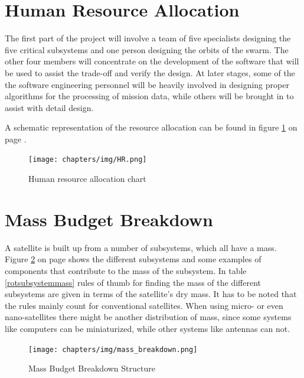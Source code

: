 \section{Human Resource Allocation}
\label{DDHR}
The first part of the project will involve a team of five specialists designing the five critical subsystems and one person designing the orbits of the swarm. The other four members will concentrate on the development of the software that will be used to assist the trade-off and verify the design. At later stages, some of the the software engineering personnel will be heavily involved in designing proper algorithms for the processing of mission data, while others will be brought in to assist with detail design. 

A schematic representation of the resource allocation can be found in figure \ref{fig:blBBHR} on page \pageref{fig:blBBHR}.

\begin{figure}[ht!]
\begin{center}
\texttt{[image: chapters/img/HR.png]}
\label{fig:blBBHR}
\caption{Human resource allocation chart}
\end{center}
\end{figure}


\section{Mass Budget Breakdown}
\label{sect_mass_budget}
A satellite is built up from a number of subsystems, which all have a mass. Figure \ref{massbreakdown} on page \pageref{massbreakdown} shows the different subsystems and some examples of components that contribute to the mass of the subsystem. In table \ref{rotsubsystemmass} rules of thumb for finding the mass of the different subsystems are given in terms of the satellite's dry mass. It has to be noted that the rules mainly count for conventional satellites. When using micro- or even nano-satellites there might be another distribution of mass, since some systems like computers can be miniaturized, while other systems like antennas can not. 

\begin{figure} [ht]
\centering
\texttt{[image: chapters/img/mass\_breakdown.png]}
\label{massbreakdown}
\caption{Mass Budget Breakdown Structure}
\end{figure}

